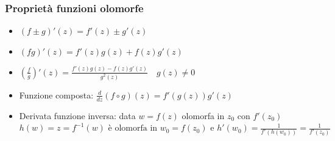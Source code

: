 \documentclass[a4paper,11pt]{report}
\theoremstyle{remark}
\theoremstyle{definition}
\begin{document}
\subsubsection*{Proprietà funzioni olomorfe}
\begin{itemize}
	\item $(f \pm g)' (z) = f'(z) \pm g'(z)$
	\item $(fg)'(z) = f'(z)g(z) + f(z)g'(z)$
	\item $\left(\frac{f}{g}\right)'(z) = \frac{f'(z)g(z) - f(z)g'(z)}{g^2(z)} \quad g(z) \ne 0$ 
	\item Funzione composta: \quad $\frac{d}{dz} (f \circ g) (z) = f'(g(z))g'(z)$
	\item Derivata funzione inversa: data $w= f(z)$ olomorfa in $z_0$ con $f'(z_0)$ \newline
	$h(w) = z = f^{-1}(w) \text{ è olomorfa in } w_0=f(z_0) \text{ e } h'(w_0) = \frac{1}{f'(h(w_0))} = \frac{1}{f'(z_0)}$
\end{itemize}
\end{document}

